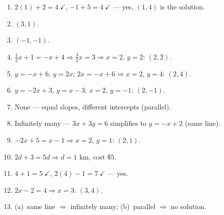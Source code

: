 \documentclass[11pt]{article}
\begin{document}
\begin{keybox}
\begin{multicols}{2}
\small
\begin{enumerate}[leftmargin=*,itemsep=3pt]
  \item $2(1)+2=4\ \checkmark$, $-1+5=4\ \checkmark$ --- yes, $(1,4)$ is the solution.
  \item $(3,1)$.
  \item $(-1,-1)$.
  \item $\tfrac12x+1=-x+4\Rightarrow \tfrac32x=3\Rightarrow x=2$, $y=2$: $(2,2)$.
  \item $y=-x+6$, $y=2x$; $2x=-x+6\Rightarrow x=2$, $y=4$: $(2,4)$.
  \item $y=-2x+3$, $y=x-3$; $x=2$, $y=-1$: $(2,-1)$.
  \item None --- equal slopes, different intercepts (parallel).
  \item Infinitely many --- $3x+3y=6$ simplifies to $y=-x+2$ (same line).
  \item $-2x+5=x-1\Rightarrow x=2$, $y=1$: $(2,1)$.
  \item $2d+3=5d\Rightarrow d=1$ km, cost $\$5$.
  \item $4+1=5\ \checkmark$, $2(4)-1=7\ \checkmark$ --- yes.
  \item $2x-2=4\Rightarrow x=3$: $(3,4)$.
  \item (a)~same line $\Rightarrow$ infinitely many; (b)~parallel $\Rightarrow$ no solution.
\end{enumerate}
\end{multicols}
\end{keybox}
\end{document}
